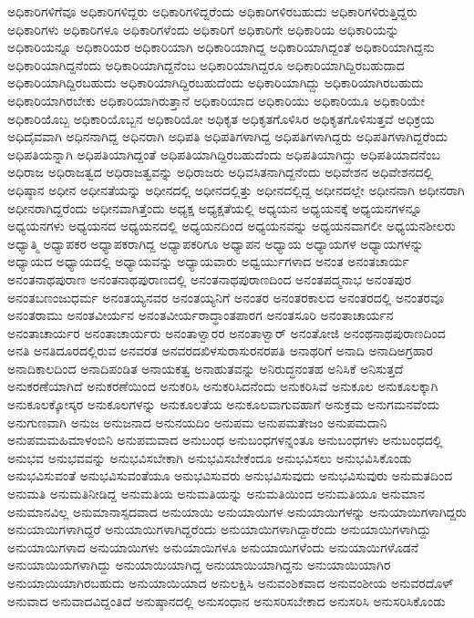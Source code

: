 {ಅಧಿಕಾರಿಗಳಿಗೆವೂ
ಅಧಿಕಾರಿಗಳಿದ್ದರು
ಅಧಿಕಾರಿಗಳಿದ್ದರೆಂದು
ಅಧಿಕಾರಿಗಳಿರಬಹುದು
ಅಧಿಕಾರಿಗಳಿರುತ್ತಿದ್ದರು
ಅಧಿಕಾರಿಗಳು
ಅಧಿಕಾರಿಗಳೂ
ಅಧಿಕಾರಿಗಳೆಂದು
ಅಧಿಕಾರಿಗೆ
ಅಧಿಕಾರಿಗೇ
ಅಧಿಕಾರಿಯ
ಅಧಿಕಾರಿಯನ್ನು
ಅಧಿಕಾರಿಯನ್ನೂ
ಅಧಿಕಾರಿಯರ
ಅಧಿಕಾರಿಯಾಗಿ
ಅಧಿಕಾರಿಯಾಗಿದ್ದ
ಅಧಿಕಾರಿಯಾಗಿದ್ದಂತೆ
ಅಧಿಕಾರಿಯಾಗಿದ್ದನು
ಅಧಿಕಾರಿಯಾಗಿದ್ದನೆಂದು
ಅಧಿಕಾರಿಯಾಗಿದ್ದನೆಂಬ
ಅಧಿಕಾರಿಯಾಗಿದ್ದರೂ
ಅಧಿಕಾರಿಯಾಗಿದ್ದಿರಬಹುದಾದ
ಅಧಿಕಾರಿಯಾಗಿದ್ದಿರಬಹುದು
ಅಧಿಕಾರಿಯಾಗಿದ್ದಿರಬಹುದೆಂದು
ಅಧಿಕಾರಿಯಾಗಿದ್ದು
ಅಧಿಕಾರಿಯಾಗಿರಬಹುದು
ಅಧಿಕಾರಿಯಾಗಿರಬೇಕು
ಅಧಿಕಾರಿಯಾಗಿರುತ್ತಾನೆ
ಅಧಿಕಾರಿಯಾದ
ಅಧಿಕಾರಿಯು
ಅಧಿಕಾರಿಯೂ
ಅಧಿಕಾರಿಯೇ
ಅಧಿಕಾರಿಯೊಬ್ಬ
ಅಧಿಕಾರಿಯೊಬ್ಬನ
ಅಧಿಕಾರಿಯೋ
ಅಧಿಕೃತ
ಅಧಿಕೃತಗೊಳಿಸಿರ
ಅಧಿಕೃತಗೊಳಿಸುತ್ತವೆ
ಅಧಿಕ್ರಯ
ಅಧಿದೈವವಾಗಿ
ಅಧಿನನಾಗಿದ್ದ
ಅಧಿನರಾಗಿ
ಅಧಿಪತಿ
ಅಧಿಪತಿಗಳಾಗಿದ್ದ
ಅಧಿಪತಿಗಳಾಗಿದ್ದರು
ಅಧಿಪತಿಗಳಾಗಿದ್ದರೆಂದು
ಅಧಿಪತಿಯನ್ನಾಗಿ
ಅಧಿಪತಿಯಾಗಿದ್ದಂತೆ
ಅಧಿಪತಿಯಾಗಿದ್ದಿರಬಹುದೆಂದು
ಅಧಿಪತಿಯಾಗಿದ್ದು
ಅಧಿಪತಿಯಾದನೆಂಬ
ಅಧಿರಾಜ
ಅಧಿರಾಜತ್ವದ
ಅಧಿರಾಜತ್ವವನ್ನು
ಅಧಿರಾಜರು
ಅಧಿವಸಿತನಾಗಿದ್ದನೆಂದು
ಅಧಿವೇಶನ
ಅಧಿವೇಶನದಲ್ಲಿ
ಅಧಿಷ್ಠಾನ
ಅಧೀನ
ಅಧೀನತೆಯನ್ನು
ಅಧೀನದಲ್ಲಿ
ಅಧೀನದಲ್ಲಿತ್ತು
ಅಧೀನದಲ್ಲಿದ್ದ
ಅಧೀನದಲ್ಲೇ
ಅಧೀನನಾಗಿ
ಅಧೀನರಾಗಿ
ಅಧೀನರಾಗಿದ್ದರೆಂದು
ಅಧೀನವಾಗಿತ್ತೆಂದು
ಅಧ್ಯಕ್ಷ
ಅಧ್ಯಕ್ಷತೆಯಲ್ಲಿ
ಅಧ್ಯಯನ
ಅಧ್ಯಯನಕ್ಕೆ
ಅಧ್ಯಯನಗಳನ್ನೂ
ಅಧ್ಯಯನಗಳು
ಅಧ್ಯಯನದ
ಅಧ್ಯಯನದಲ್ಲಿ
ಅಧ್ಯಯನದಿಂದ
ಅಧ್ಯಯನವನ್ನು
ಅಧ್ಯಯನವಾಗಲೀ
ಅಧ್ಯಯನಶೀಲರು
ಅಧ್ಯಾತ್ಮಿ
ಅಧ್ಯಾಪಕರ
ಅಧ್ಯಾಪಕರಾಗಿದ್ದ
ಅಧ್ಯಾಪಕರಿಗೂ
ಅಧ್ಯಾಪನ
ಅಧ್ಯಾಯ
ಅಧ್ಯಾಯಗಳ
ಅಧ್ಯಾಯಗಳನ್ನು
ಅಧ್ಯಾಯದ
ಅಧ್ಯಾಯದಲ್ಲಿ
ಅಧ್ಯಾಯವನ್ನು
ಅಧ್ಯಾಯವಾರು
ಅಧ್ವರ್ಯುಗಳಾದ
ಅನಂತ
ಅನಂತಚಾರ್ಯ
ಅನಂತನಾಥಪುರಾಣ
ಅನಂತನಾಥಪುರಾಣದಲ್ಲಿ
ಅನಂತನಾಥಪುರಾಣದಿಂದ
ಅನಂತಪದ್ಮನಾಭ
ಅನಂತಪುರ
ಅನಂತಬಣಂಜುಧರ್ಮ
ಅನಂತಯ್ಯನವರ
ಅನಂತಯ್ಯನಿಗೆ
ಅನಂತರ
ಅನಂತರಕಾಲದ
ಅನಂತರದಲ್ಲಿ
ಅನಂತರವೂ
ಅನಂತರಾಮು
ಅನಂತವೀರ್ಯನ
ಅನಂತವೀರ್ಯರಾದ್ಧಾಂತಪಾರಗ
ಅನಂತಸೂರಿ
ಅನಂತಾಚಾರ್ಯನ
ಅನಂತಾಚಾರ್ಯರ
ಅನಂತಾಚಾರ್ಯರು
ಅನಂತಾಳ್ವಾರರ
ಅನಂತಾಳ್ವಾರ್
ಅನಂತೋಜಿ
ಅನಂಥನಾಥಪುರಾಣದಿಂದ
ಅನತಿ
ಅನತಿದೂರದಲ್ಲಿರುವ
ಅನವರತ
ಅನವರದಖಿಳಸುರಾಸುರನರಪತಿ
ಅನಾಥರಿಗೆ
ಅನಾದಿ
ಅನಾದಿಅಗ್ರಹಾರ
ಅನಾದಿಕಾಲದಿಂದ
ಅನಾದಿಪಂಡಿತ
ಅನಾಯಕತ್ವ
ಅನಾಹುತವನ್ನು
ಅನಿರುದ್ಧನಂತಹ
ಅನಿಸಿಕೆ
ಅನಿಸುತ್ತದೆ
ಅನುಕರಣೆಯಾಗಿದೆ
ಅನುಕರಣೆಯಿಂದ
ಅನುಕರಿಸಿ
ಅನುಕರಿಸಿದನೆಂದು
ಅನುಕರಿಸಿವೆ
ಅನುಕೂಲ
ಅನುಕೂಲಕ್ಕಾಗಿ
ಅನುಕೂಲಕ್ಕೋಸ್ಕರ
ಅನುಕೂಲಗಳನ್ನು
ಅನುಕೂಲತೆಯ
ಅನುಕೂಲವಾಗುವಹಾಗೆ
ಅನುಕ್ರಮ
ಅನುಗಮನವೆಂದು
ಅನುಗುಣವಾಗಿ
ಅನುಜ
ಅನುಜನಾದ
ಅನುನಯದಿಂ
ಅನುಪಮ
ಅನುಪಮತೇಜಂ
ಅನುಪಮದಾನಿ
ಅನುಪಮಮಹಿಮಾಳಂಬಿನಿ
ಅನುಪಮವಾದ
ಅನುಬಂಧ
ಅನುಬಂಧಗಳನ್ನಂತೂ
ಅನುಬಂಧಗಳು
ಅನುಬಂಧದಲ್ಲಿ
ಅನುಭವ
ಅನುಭವವನ್ನು
ಅನುಭವಿಸಬೇಕಾಗಿ
ಅನುಭವಿಸಬೇಕೆಂದೂ
ಅನುಭವಿಸಲು
ಅನುಭವಿಸಿಕೊಂಡು
ಅನುಭವಿಸುವಂತೆ
ಅನುಭವಿಸುವಂತೆಯೂ
ಅನುಭವಿಸುವರು
ಅನುಭವಿಸುವುದು
ಅನುಭವಿಸುವುರು
ಅನುಮತದಿಂದ
ಅನುಮತಿ
ಅನುಮತಿನೀಡಿದ್ದ
ಅನುಮತಿಯ
ಅನುಮತಿಯನ್ನು
ಅನುಮತಿಯಿಂದ
ಅನುಮತಿಯೂ
ಅನುಮಾನ
ಅನುಮಾನವಿಲ್ಲ
ಅನುಮಾನಾಸ್ಪದವಾದ
ಅನುಯಾಯಿ
ಅನುಯಾಯಿಗಳ
ಅನುಯಾಯಿಗಳನ್ನು
ಅನುಯಾಯಿಗಳಾಗಿದ್ದರು
ಅನುಯಾಯಿಗಳಾಗಿದ್ದರೆ
ಅನುಯಾಯಿಗಳಾಗಿದ್ದರೆಂದು
ಅನುಯಾಯಿಗಳಾಗಿದ್ದಾರೆಂದು
ಅನುಯಾಯಿಗಳಾಗಿದ್ದು
ಅನುಯಾಯಿಗಳಾದ
ಅನುಯಾಯಿಗಳು
ಅನುಯಾಯಿಗಳೂ
ಅನುಯಾಯಿಗಳೆಂದು
ಅನುಯಾಯಿಗಳೊಡನೆ
ಅನುಯಾಯಿಯಗಳಾಗಿದ್ದು
ಅನುಯಾಯಿಯಾಗಿದ್ದ
ಅನುಯಾಯಿಯಾಗಿದ್ದನು
ಅನುಯಾಯಿಯಾಗಿರ
ಅನುಯಾಯಿಯಾಗಿರಬಹುದು
ಅನುಯಾಯಿಯಾದ
ಅನುಲಕ್ಷಿಸಿ
ಅನುವಂಶಿಕವಾದ
ಅನುವಂಶೀಯ
ಅನುವರದೊಳ್
ಅನುವಾದ
ಅನುವಾದವಿದ್ದಂತಿದೆ
ಅನುಷ್ಠಾನದಲ್ಲಿ
ಅನುಸಂಧಾನ
ಅನುಸರಿಸಬೇಕಾದ
ಅನುಸರಿಸಿ
ಅನುಸರಿಸಿಕೊಂಡು
}
